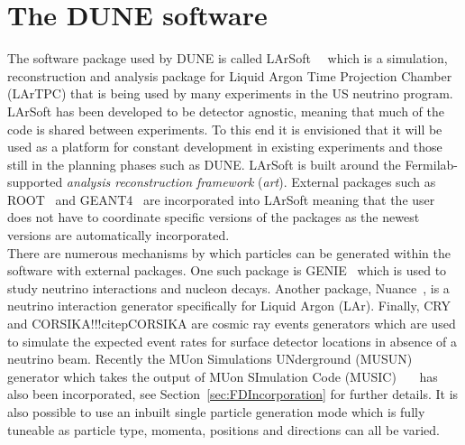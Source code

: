 \section{The DUNE software} \label{sec:LArSoft} %
The software package used by DUNE is called LArSoft~\citep{Church_LArSoft}~\citep{LArSoftOrg} which is a simulation, reconstruction and analysis package for Liquid Argon Time Projection Chamber (LArTPC) that is being used by many experiments in the US neutrino program. LArSoft has been developed to be detector agnostic, meaning that much of the code is shared between experiments. To this end it is envisioned that it will be used as a platform for constant development in existing experiments and those still in the planning phases such as DUNE. LArSoft is built around the Fermilab-supported \emph{analysis reconstruction framework} (\emph{art}). External packages such as ROOT~\citep{ROOT} and GEANT4~\citep{GEANT4} are incorporated into LArSoft meaning that the user does not have to coordinate specific versions of the packages as the newest versions are automatically incorporated. \\

There are numerous mechanisms by which particles can be generated within the software with external packages. One such package is GENIE~\citep{GENIE} which is used to study neutrino interactions and nucleon decays. Another package, Nuance~\citep{Nuance}, is a neutrino interaction generator specifically for Liquid Argon (LAr). Finally, CRY~\citep{CRY,CRY2} and CORSIKA!!!citep{CORSIKA} are cosmic ray events generators which are used to simulate the expected event rates for surface detector locations in absence of a neutrino beam. Recently the MUon Simulations UNderground (MUSUN)~\citep{MUSUN}~\citep{MUSUN2} generator which takes the output of MUon SImulation Code (MUSIC)~\citep{MUSUN}~\citep{MUSIC}~\citep{MUSIC2} has also been incorporated, see Section~\ref{sec:FDIncorporation} for further details. It is also possible to use an inbuilt single particle generation mode which is fully tuneable as particle type, momenta, positions and directions can all be varied. \\

